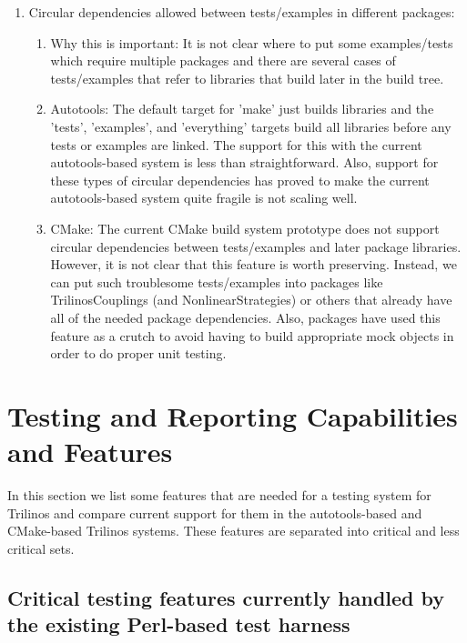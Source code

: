 \documentclass[pdf,ps2pdf,11pt]{SANDreport}
\begin{document}
\begin{enumerate}
\begin{enumerate}
  \end{enumerate}

{}\item Circular dependencies allowed between tests/examples in
different packages:

  \begin{enumerate}

  {}\item Why this is important: It is not clear where to put some
  examples/tests which require multiple packages and there are
  several cases of tests/examples that refer to libraries that build
  later in the build tree.

  {}\item Autotools: The default target for 'make' just builds
  libraries and the 'tests', 'examples', and 'everything' targets
  build all libraries before any tests or examples are linked.  The
  support for this with the current autotools-based system is less than
  straightforward.  Also, support for these types of circular
  dependencies has proved to make the current autotools-based system
  quite fragile is not scaling well.

  {}\item CMake: The current CMake build system prototype does not
  support circular dependencies between tests/examples and later package
  libraries.  However, it is not clear that this feature is worth
  preserving.  Instead, we can put such troublesome tests/examples
  into packages like TrilinosCouplings (and NonlinearStrategies) or
  others that already have all of the needed package dependencies.
  Also, packages have used this feature as a crutch to avoid having to
  build appropriate mock objects in order to do proper unit testing.

  \end{enumerate}

\end{enumerate}


%
\section{Testing and Reporting Capabilities and Features}
%

In this section we list some features that are needed for a testing
system for Trilinos and compare current support for them in the
autotools-based and CMake-based Trilinos systems.  These features are
separated into critical and less critical sets.


%
{}\subsection{Critical testing features currently handled by the
existing Perl-based test harness}
%
\end{document}

